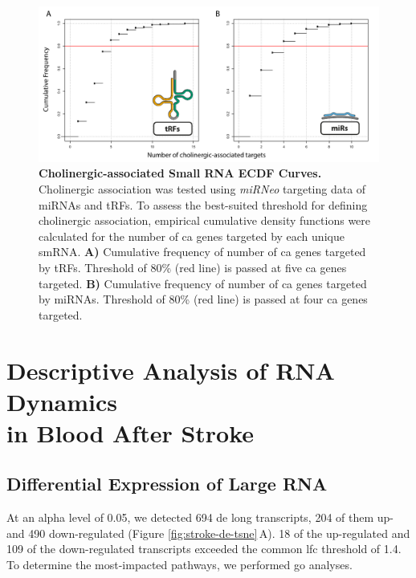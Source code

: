 \begin{figure}
\includegraphics[width=\textwidth]{figures/cholino-ecdfs}
\caption[Cholinergic-associated Small RNA ECDF Curves.]{\textbf{Cholinergic-associated Small RNA ECDF Curves.} Cholinergic association was tested using \emph{miRNeo} targeting data of miRNAs and tRFs. To assess the best-suited threshold for defining cholinergic association, empirical cumulative density functions were calculated for the number of \acf{ca} genes targeted by each unique smRNA. \textbf{A)} Cumulative frequency of number of \ac{ca} genes targeted by tRFs. Threshold of 80\% (red line) is passed at five \ac{ca} genes targeted. \textbf{B)} Cumulative frequency of number of \ac{ca} genes targeted by miRNAs. Threshold of 80\% (red line) is passed at four \ac{ca} genes targeted.
\label{fig:cholino-ecdfs}}
\end{figure}

\newpage

\section[Descriptive Analysis of RNA Dynamics in Blood After Stroke]{Descriptive Analysis of RNA Dynamics \\in Blood After Stroke} \label{sec:stroke:descriptive}

\subsection{Differential Expression of Large RNA} \label{sec:stroke:mrna}
At an alpha level of 0.05, we detected 694 \acf{de} long transcripts, 204 of them up- and 490 down-regulated (Figure \ref{fig:stroke-de-tsne}\,A). 18 of the up-regulated and 109 of the down-regulated transcripts exceeded the common \acf{lfc} threshold of 1.4. To determine the most-impacted pathways, we performed \ac{go} analyses.

